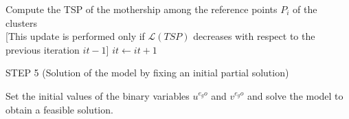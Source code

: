 \begin{algorithm}
\begin{algorithmic}
\State Compute the TSP of the mothership among the reference points $P_i$ of the clusters\\
\State {} [This update is performed only if $\mathcal L(TSP)$ decreases with respect to the previous iteration $it - 1$]
\State $it \gets it+1$\\
\end{algorithmic}
STEP 5 (Solution of the \AMD\xspace model by fixing an initial partial solution)
\begin{algorithmic}
\State Set the initial values of the binary variables $u^{e_{g}o}$ and $v^{e_{g}o}$ and solve the model \CV{\AMD}\xspace to obtain a feasible solution.
\end{algorithmic}
\end{algorithm}

